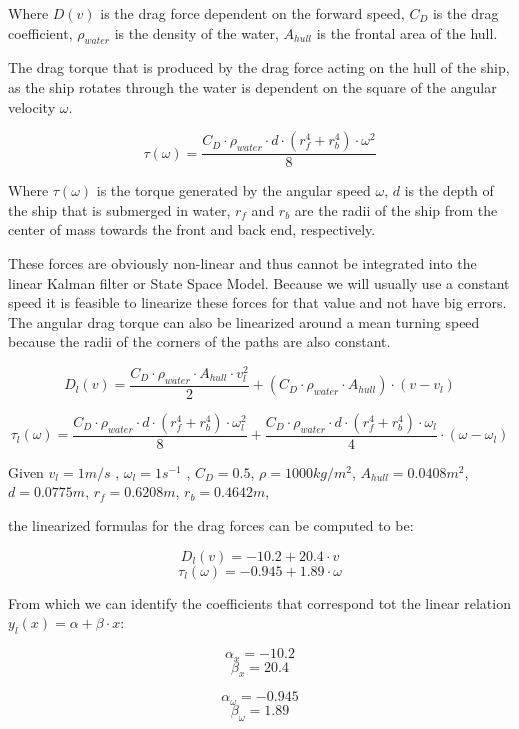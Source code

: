 Where $D(v)$ is the drag force dependent on the forward speed, $C_{D}$ is the drag coefficient, $\rho_{water}$ is the density of the water, $A_{hull}$ is the frontal area of the hull. 

The drag torque that is produced by the drag force acting on the hull of the ship, as the ship rotates through the water is dependent on the square of the angular velocity $ \omega $.

\[ \tau(\omega) = \frac{C_{D} \cdot \rho_{water} \cdot d \cdot (r_{f}^{4} + r_{b}^{4}) \cdot \omega^{2}}{8} \]

Where $ \tau(\omega) $ is the torque generated by the angular speed $ \omega $, $ d  $ is the depth of the ship that is submerged in water, $ r_{f} $ and $ r_{b} $ are the radii of the ship from the center of mass towards the front and back end, respectively.

These forces are obviously non-linear and thus cannot be integrated into the linear Kalman filter or State Space Model. Because we will usually use a constant speed it is feasible to linearize these forces for that value and not have big errors. The angular drag torque can also be linearized around a mean turning speed because the radii of the corners of the paths are also constant.

\[ D_{l}(v) = \frac{C_{D}\cdot\rho_{water}\cdot A_{hull}\cdot v_{l}^{2}}{2} + (C_{D}\cdot\rho_{water}\cdot A_{hull})\cdot (v-v_{l}) \]

\[ \tau_{l}(\omega) = \frac{C_{D} \cdot \rho_{water} \cdot d \cdot (r_{f}^{4} + r_{b}^{4}) \cdot \omega_{l}^{2}}{8} + \frac{C_{D} \cdot \rho_{water} \cdot d \cdot (r_{f}^{4} + r_{b}^{4}) \cdot \omega_{l}}{4} \cdot (\omega - \omega_{l}) \] 

Given 
 $ v_{l} = 1m/s $ ,
 $ \omega_{l} = 1 s ^{-1} $ ,
 $ C_{D} = 0.5 $,
 $ \rho = 1000 kg/m ^{2} $,
 $ A_{hull} = 0.0408 m^{2} $,
 $ d = 0.0775 m $,
 $ r_{f} = 0.6208 m $,
 $ r_{b} = 0.4642 m $,
 
the linearized formulas for the drag forces can be computed to be:

\[ D_{l}(v) = -10.2 + 20.4 \cdot v \]
\[ \tau_{l}(\omega) = -0.945 + 1.89 \cdot \omega \]

From which we can identify the coefficients that correspond tot the linear relation $ y_{l}(x) = \alpha + \beta \cdot x $:\\
\begin{minipage}{0.35\linewidth}	
\[ \alpha_{x} = -10.2 \] 
\[ \beta_{x} = 20.4 \]
\end{minipage}
\begin{minipage}{0.35\linewidth}
\[ \alpha_{\omega} = -0.945 \]
\[ \beta_{\omega} = 1.89 \]
\end{minipage}


